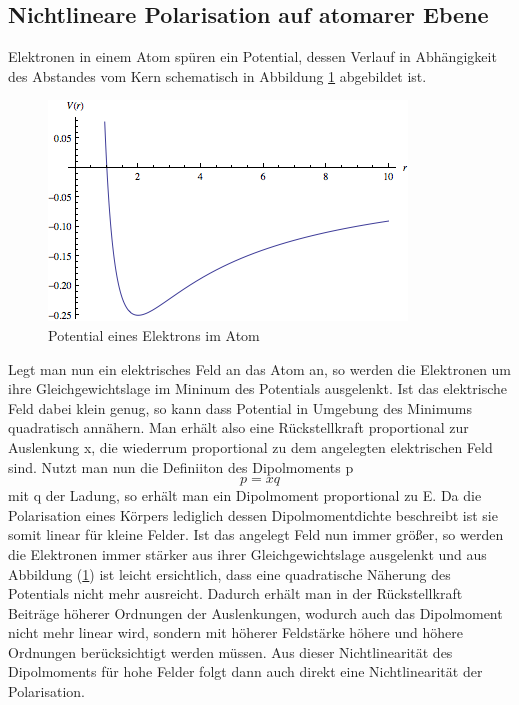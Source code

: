 \subsection{Nichtlineare Polarisation auf atomarer Ebene}
Elektronen in einem Atom spüren ein Potential, dessen Verlauf in Abhängigkeit des Abstandes vom Kern schematisch in Abbildung \ref{Potential} abgebildet ist. 
\begin{figure}[H]
	\begin{center}
		\includegraphics[scale=.75]{Bilder/Potential.png}
		\caption{Potential eines Elektrons im Atom}
		\label{Potential}
	\end{center}
\end{figure}
Legt man nun ein elektrisches Feld an das Atom an, so werden die Elektronen um ihre Gleichgewichtslage im Mininum des Potentials ausgelenkt. Ist das elektrische Feld dabei klein genug, so kann dass Potential in Umgebung des Minimums quadratisch annähern. Man erhält also eine Rückstellkraft proportional zur Auslenkung x, die wiederrum proportional zu dem angelegten elektrischen Feld sind. Nutzt man nun die Definiiton des Dipolmoments p
\begin{equation}
	p=xq
\end{equation}
mit q der Ladung, so erhält man ein Dipolmoment proportional zu E. Da die Polarisation eines Körpers lediglich dessen Dipolmomentdichte beschreibt ist sie somit linear für kleine Felder. \newline
Ist das angelegt Feld nun immer größer, so werden die Elektronen immer stärker aus ihrer Gleichgewichtslage ausgelenkt und aus Abbildung (\ref{Potential}) ist leicht ersichtlich, dass eine quadratische Näherung des Potentials nicht mehr ausreicht. Dadurch erhält man in der Rückstellkraft Beiträge höherer Ordnungen der Auslenkungen, wodurch auch das Dipolmoment nicht mehr linear wird, sondern mit höherer Feldstärke höhere und höhere Ordnungen berücksichtigt werden müssen. Aus dieser Nichtlinearität des Dipolmoments für hohe Felder folgt dann auch direkt eine Nichtlinearität der Polarisation. 

